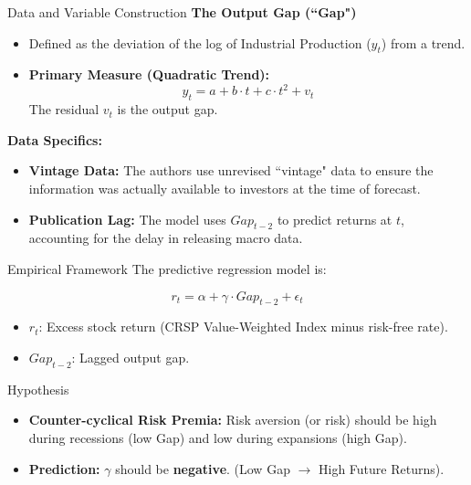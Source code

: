 \documentclass{beamer}
\begin{document}
\begin{frame}{Data and Variable Construction}
    \textbf{The Output Gap (``Gap")}
    \begin{itemize}
        \item Defined as the deviation of the log of Industrial Production ($y_t$) from a trend.
        \item \textbf{Primary Measure (Quadratic Trend):}
        \begin{equation}
            y_t = a + b \cdot t + c \cdot t^2 + v_t
        \end{equation}
        The residual $v_t$ is the output gap.
    \end{itemize}

    
    \textbf{Data Specifics:}
    \begin{itemize}
        \item \textbf{Vintage Data:} The authors use unrevised ``vintage" data to ensure the information was actually available to investors at the time of forecast.
        \item \textbf{Publication Lag:} The model uses $Gap_{t-2}$ to predict returns at $t$, accounting for the delay in releasing macro data.
    \end{itemize}
\end{frame}

\begin{frame}{Empirical Framework}
    The predictive regression model is:
    
    \begin{equation}
        r_t = \alpha + \gamma \cdot Gap_{t-2} + \epsilon_t
    \end{equation}

    \begin{itemize}
        \item $r_t$: Excess stock return (CRSP Value-Weighted Index minus risk-free rate).
        \item $Gap_{t-2}$: Lagged output gap.
    \end{itemize}

    \begin{block}{Hypothesis}
        \begin{itemize}
            \item \textbf{Counter-cyclical Risk Premia:} 
            Risk aversion (or risk) should be high during recessions (low Gap) and low during expansions (high Gap).
            \item \textbf{Prediction:} $\gamma$ should be \textbf{negative}.
            (Low Gap $\rightarrow$ High Future Returns).
        \end{itemize}
    \end{block}
\end{frame}
\end{document}
